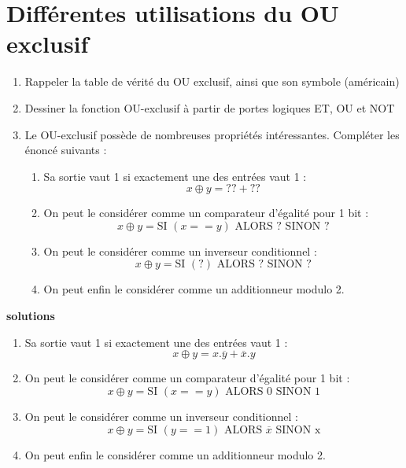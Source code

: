 \documentclass[a4paper,11pt]{article}
\begin{document}
\section{Différentes utilisations du OU exclusif}
\begin{enumerate}

\item Rappeler la table de vérité du OU exclusif, ainsi que son symbole (américain)
\item Dessiner la fonction OU-exclusif à partir de portes logiques ET, OU et NOT
\item Le OU-exclusif possède de nombreuses propriétés intéressantes. Compléter les énoncé suivants :

\begin{enumerate}
\item Sa sortie vaut 1 si exactement une des entrées vaut 1 :
$$x \oplus y  = ?? + ??$$
\item On peut le considérer comme un comparateur d'égalité pour 1 bit :
$$x \oplus y = \textrm{SI } (x==y) \textrm{ ALORS ? SINON ?} $$
\item On peut le considérer comme un inverseur conditionnel :
$$x \oplus y = \textrm{SI } (?) \textrm{ ALORS ? SINON ?} $$
\item On peut enfin le considérer comme un additionneur modulo 2.

\end{enumerate}

\end{enumerate}

\begin{cadre}
{\bf solutions}
  \begin{enumerate}
  \item Sa sortie vaut 1 si exactement une des entrées vaut 1 : $$x \oplus y  = x.\overline{y} + \overline{x}.y$$
  \item On peut le considérer comme un comparateur d'égalité pour 1 bit : $$x \oplus y = \textrm{SI } (x==y) \textrm{ ALORS 0 SINON 1} $$
  \item On peut le considérer comme un inverseur conditionnel : $$x \oplus y = \textrm{SI } (y==1) \textrm{ ALORS } \overline{x} \textrm{ SINON x}$$
  \item On peut enfin le considérer comme un additionneur modulo 2.
  \end{enumerate}
\end{cadre}
\end{document}
